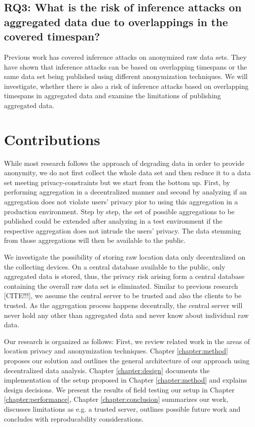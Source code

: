 \subsection*{RQ3: What is the risk of inference attacks on aggregated data due to overlappings in the covered timespan?}
Previous work has covered inference attacks on anonymized raw data sets. They have shown that inference attacks can be based on overlapping timespans or the same data set being published using different anonymization techniques. We will investigate, whether there is also a risk of inference attacks based on overlapping timespans in aggregated data and examine the limitations of publishing aggregated data.

\section{Contributions}
While most research follows the approach of degrading data in order to provide anonymity, we do not first collect the whole data set and then reduce it to a data set meeting privacy-constraints but we start from the bottom up. First, by performing aggregation in a decentralized manner and second by analyzing if an aggregation does not violate users' privacy pior to using this aggregation in a production environment. Step by step, the set of possible aggregations to be published could be extended after analyzing in a test environment if the respective aggregation does not intrude the users' privacy. The data stemming from those aggregations will then be available to the public. 

We investigate the possibility of storing raw location data only decentralized on the collecting devices. On a central database available to the public, only aggregated data is stored, thus, the privacy risk arising form a central database containing the overall raw data set is eliminated. Similar to previous research [CITE!!!], we assume the central server to be trusted and also the clients to be trusted. As the aggregation process happens decentrally, the central server will never hold any other than aggregated data and never know about individual raw data. 

Our research is organized as follows: First, we review related work in the areas of location privacy and anonymization techniques.
Chapter \ref{chapter:method} proposes our solution and outlines the general architecture of our approach using decentralized data analysis. Chapter \ref{chapter:design} documents the implementation of the setup proposed in Chapter \ref{chapter:method} and explains design decisions. We present the results of field testing our setup in Chapter \ref{chapter:performance}, Chapter \ref{chapter:conclusion} summarizes our work, discusses limitations as e.g. a trusted server, outlines possible future work and concludes with reproducability considerations.